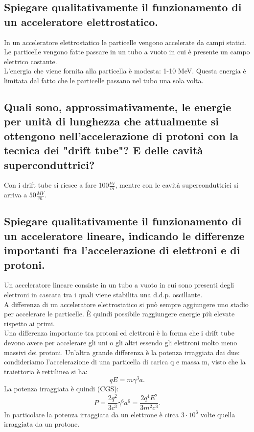 \subsection[\hspace{1mm} Funzionamento di un acceleratore elettrostatico]{Spiegare qualitativamente il funzionamento di un acceleratore elettrostatico.}
\label{sec:3.a.18}
In un acceleratore elettrostatico le particelle vengono accelerate da campi statici. Le particelle vengono fatte passare in un tubo a vuoto in cui è presente un campo elettrico costante.\\ 
L'energia che viene fornita alla particella è modesta: 1-10 MeV. Questa energia è limitata dal fatto che le particelle passano nel tubo una sola volta. 

\subsection[\hspace{1mm} Energie per unità di lunghezza per drift tube e cavità superconduttrici]{Quali sono, approssimativamente, le energie per unità di lunghezza che attualmente si ottengono nell’accelerazione di protoni con la tecnica dei "drift tube"? E delle cavità superconduttrici?}
\label{sec:3.a.19}
Con i drift tube si riesce a fare $ 100 \frac{kV}{m}$, mentre con le cavità superconduttrici si arriva a $ 50 \frac{MV}{m}$. 


\subsection[\hspace{1mm} Funzionamento di un acceleratore lineare]{Spiegare qualitativamente il funzionamento di un acceleratore lineare, indicando le differenze importanti fra l’accelerazione di elettroni e di protoni.}
\label{sec:3.a.20}
Un acceleratore lineare consiste in un tubo a vuoto in cui sono presenti degli elettroni in cascata tra i quali viene stabilita una d.d.p. oscillante. \\
A differenza di un acceleratore elettrostatico si può sempre aggiungere uno stadio per accelerare le particelle. È quindi possibile raggiungere energie più elevate rispetto ai primi. \\
Una differenza importante tra protoni ed elettroni è la forma che i drift tube devono avere per accelerare gli uni o gli altri essendo gli elettroni molto meno massivi dei protoni. 
Un'altra grande differenza è la potenza irraggiata dai due: condideriamo l'accelerazione di una particella di carica q e massa m, visto che la traiettoria è rettilinea si ha:
\[
	qE=m \gamma^3a	
.\]
La potenza irraggiata è quindi (CGS):
\[
	P= \frac{2q^2}{3c^3}\gamma^{6}a^{6}=\frac{2q^4E^2}{3m^2c^3}	
.\]
In particolare la potenza irraggiata da un elettrone è circa $3 \cdot 10^{6} $ volte quella irraggiata da un protone.

